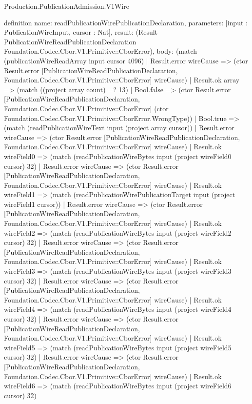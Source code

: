 \begin{lexlean}{Production.PublicationAdmission.V1Wire}
\begin{semanticmodule}
definition{
  name: readPublicationWirePublicationDeclaration,
  parameters: [input : PublicationWireInput, cursor : Nat],
  result: (Result PublicationWireReadPublicationDeclaration Foundation.Codec.Cbor.V1.Primitive::CborError),
  body: (match (publicationWireReadArray input cursor 4096)
    | Result.error wireCause => (ctor Result.error [PublicationWireReadPublicationDeclaration, Foundation.Codec.Cbor.V1.Primitive::CborError] wireCause)
    | Result.ok array => (match ((project array count) =? 13)
      | Bool.false => (ctor Result.error [PublicationWireReadPublicationDeclaration, Foundation.Codec.Cbor.V1.Primitive::CborError] (ctor Foundation.Codec.Cbor.V1.Primitive::CborError.WrongType))
      | Bool.true => (match (readPublicationWireText input (project array cursor))
        | Result.error wireCause => (ctor Result.error [PublicationWireReadPublicationDeclaration, Foundation.Codec.Cbor.V1.Primitive::CborError] wireCause)
        | Result.ok wireField0 => (match (readPublicationWireBytes input (project wireField0 cursor) 32)
          | Result.error wireCause => (ctor Result.error [PublicationWireReadPublicationDeclaration, Foundation.Codec.Cbor.V1.Primitive::CborError] wireCause)
          | Result.ok wireField1 => (match (readPublicationWirePublicationTarget input (project wireField1 cursor))
            | Result.error wireCause => (ctor Result.error [PublicationWireReadPublicationDeclaration, Foundation.Codec.Cbor.V1.Primitive::CborError] wireCause)
            | Result.ok wireField2 => (match (readPublicationWireBytes input (project wireField2 cursor) 32)
              | Result.error wireCause => (ctor Result.error [PublicationWireReadPublicationDeclaration, Foundation.Codec.Cbor.V1.Primitive::CborError] wireCause)
              | Result.ok wireField3 => (match (readPublicationWireBytes input (project wireField3 cursor) 32)
                | Result.error wireCause => (ctor Result.error [PublicationWireReadPublicationDeclaration, Foundation.Codec.Cbor.V1.Primitive::CborError] wireCause)
                | Result.ok wireField4 => (match (readPublicationWireBytes input (project wireField4 cursor) 32)
                  | Result.error wireCause => (ctor Result.error [PublicationWireReadPublicationDeclaration, Foundation.Codec.Cbor.V1.Primitive::CborError] wireCause)
                  | Result.ok wireField5 => (match (readPublicationWireBytes input (project wireField5 cursor) 32)
                    | Result.error wireCause => (ctor Result.error [PublicationWireReadPublicationDeclaration, Foundation.Codec.Cbor.V1.Primitive::CborError] wireCause)
                    | Result.ok wireField6 => (match (readPublicationWireBytes input (project wireField6 cursor) 32)
}
\end{semanticmodule}
\end{lexlean}
